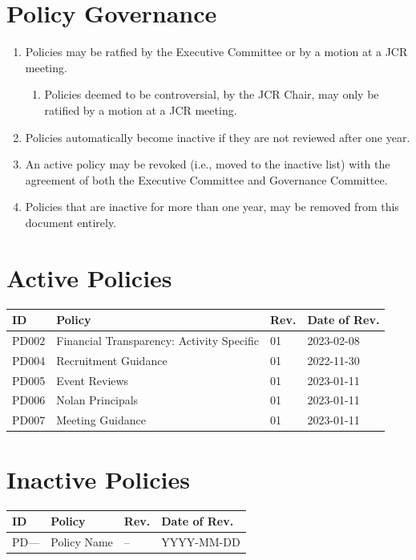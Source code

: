 \documentclass[12pt]{article}
\begin{document}
\section{Policy Governance}
\begin{enumerate}
    \item Policies may be ratfied by the Executive Committee or by a motion at a JCR meeting.
    \begin{enumerate}
        \item Policies deemed to be controversial, by the JCR Chair, may only be ratified by a motion at a JCR meeting. 
    \end{enumerate}
    \item Policies automatically become inactive if they are not reviewed after one year.
    \item An active policy may be revoked (i.e., moved to the inactive list) with the agreement of both the Executive Committee and Governance Committee.
    \item Policies that are inactive for more than one year, may be removed from this document entirely.
\end{enumerate}

\section{Active Policies}
 \begin{longtable}{|l|l|l|l|}
        \hline
        \textbf{ID} & \textbf{Policy} & \textbf{Rev.} & \textbf{Date of Rev.}  \\
        \hline\hline
        \endhead
        \hline
        \endfoot
        PD002 & Financial Transparency: Activity Specific & 01 & 2023-02-08 \\
        PD004 & Recruitment Guidance & 01 & 2022-11-30 \\
        PD005 & Event Reviews & 01 & 2023-01-11 \\
        PD006 & Nolan Principals & 01 & 2023-01-11 \\
        PD007 & Meeting Guidance & 01 & 2023-01-11 \\
    \end{longtable}
\clearpage
\section{Inactive Policies}
 \begin{longtable}{|l|l|l|l|}
        \hline
        \textbf{ID} & \textbf{Policy} & \textbf{Rev.} & \textbf{Date of Rev.}  \\
        \hline\hline
        \endhead
        \hline
        \endfoot
        PD--- & Policy Name & -- & YYYY-MM-DD \\
    \end{longtable}
\end{document}
